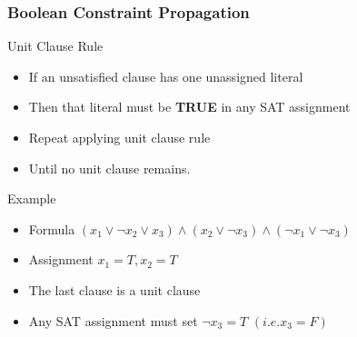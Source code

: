 \documentclass{beamer}
\begin{document}
\begin{frame}
\frametitle{Boolean Constraint Propagation}
Unit Clause Rule
\begin{itemize}
\item If an unsatisfied clause has one unassigned literal
\item Then that literal must be \textbf{TRUE} in any SAT assignment
\item Repeat applying unit clause rule
\item Until no unit clause remains.
\end{itemize}
Example
\begin{itemize}
\item Formula $(x_1 \vee \neg x_2 \vee x_3)\wedge(x_2 \vee \neg x_3)\wedge(\neg x_1 \vee \neg x_3)$
\item Assignment $x_1 = T, x_2 = T$
\item The last clause is a unit clause
\item Any SAT assignment must set $\neg x_3 = T$ $(i.e. x_3 = F)$
\end{itemize}
\end{frame}
\end{document}

